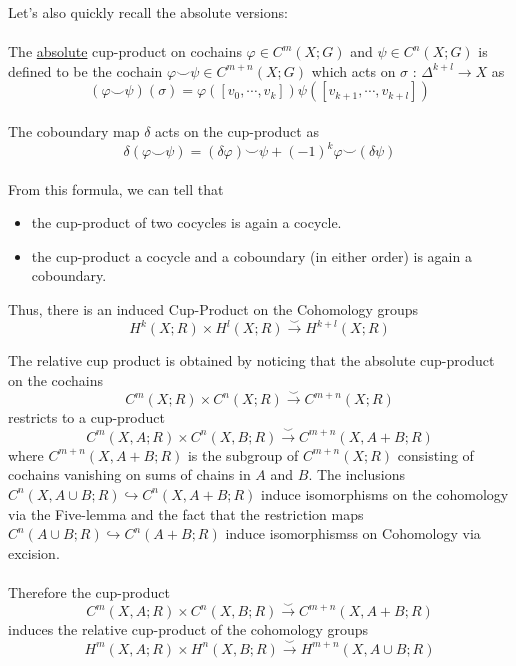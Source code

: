 \documentclass[11pt]{article}
\begin{document}
\begin{enumerate}[(a)]
  \begin{dottedbox}
    Let's also quickly recall the absolute versions:
    \\
    \\
    The \underline{absolute} cup-product on cochains $\varphi \in C^m(X; G)$ and $\psi \in C^{n}(X; G)$ is defined to be the cochain $\varphi \smile \psi \in C^{m+n}(X; G)$ which acts on $\sigma \text{ : } \Delta^{k+l} \rightarrow X$ as $$ \left(\varphi \smile \psi\right)(\sigma) = \varphi\left([v_0, \cdots, v_k]\right) \psi([v_{k+1},\cdots,v_{k+l}]) $$
    \\
    The coboundary map $\delta$ acts on the cup-product as $$ \delta(\varphi \smile \psi) = (\delta \varphi) \smile \psi + (-1)^k \varphi \smile (\delta \psi) $$
    \\
    From this formula, we can tell that 
    \begin{itemize}
      \item the cup-product of two cocycles is again a cocycle.
      \item the cup-product a cocycle and a coboundary (in either order) is again a coboundary.
    \end{itemize}
    Thus, there is an induced Cup-Product on the Cohomology groups $$ H^k(X; R) \times H^l(X; R) \xrightarrow{\smile} H^{k+l}(X; R) $$
  \end{dottedbox}

  \vskip 0.5cm
  The relative cup product is obtained by noticing that the absolute cup-product on the cochains $$ C^m(X; R) \times C^n(X; R) \xrightarrow{\smile} C^{m+n}(X; R) $$ restricts to a cup-product $$ C^m(X, A; R) \times C^n(X, B; R) \xrightarrow{\smile} C^{m+n}(X, A + B; R) $$ where $C^{m+n}(X, A + B; R)$ is the subgroup of $C^{m+n}(X; R)$ consisting of cochains vanishing on sums of chains in $A$ and $B$. The inclusions $C^n(X, A \cup B; R) \hookrightarrow C^n(X, A+B; R)$ induce isomorphisms on the cohomology via the Five-lemma and the fact that the restriction maps $C^n(A \cup B; R) \hookrightarrow C^n(A + B; R)$ induce isomorphismss on Cohomology via excision.
  \\
  \\
  Therefore the cup-product $$ C^m(X, A; R) \times C^n(X, B; R) \xrightarrow{\smile} C^{m+n}(X, A + B; R) $$ induces the relative cup-product of the cohomology groups $$ H^m(X, A; R) \times H^n(X, B; R) \xrightarrow{\smile} H^{m+n}(X, A \cup B; R) $$
  \vskip 0.5cm


\end{enumerate}
\end{document}
